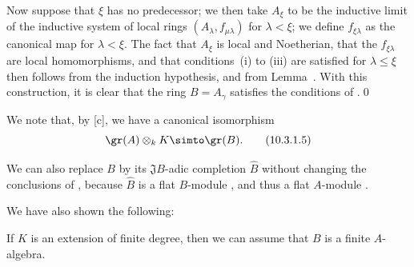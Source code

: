 \begin{env}[10.3.1.4]
Now suppose that $\xi$ has no predecessor;
we then take $A_\xi$ to be the inductive limit of the inductive system of local rings $(A_\lambda,f_{\mu\lambda})$ for $\lambda<\xi$;
we define $f_{\xi\lambda}$ as the canonical map for $\lambda<\xi$.
The fact that $A_\xi$ is local and Noetherian, that the $f_{\xi\lambda}$ are local homomorphisms, and that conditions~(i) to (iii) are satisfied for $\lambda\leq\xi$
then follows from the induction hypothesis, and from Lemma~.
With this construction, it is clear that the ring $B=A_\gamma$ satisfies the conditions of .\qed
\end{env}

We note that, by [c], we have a canonical isomorphism
\[
\label{0.10.3.1.5}
  \gr(A)\otimes_k K\simto\gr(B).
  \tag{10.3.1.5}
\]

We can also replace $B$ by its $\mathfrak{J}B$-adic completion $\widehat{B}$ without changing the conclusions of , because $\widehat{B}$ is a flat $B$-module , and thus a flat $A$-module .

We have also shown the following:
\begin{corollary}[10.3.2]
\label{0.10.3.2}
If $K$ is an extension of finite degree, then we can assume that $B$ is a finite $A$-algebra.
\end{corollary}
